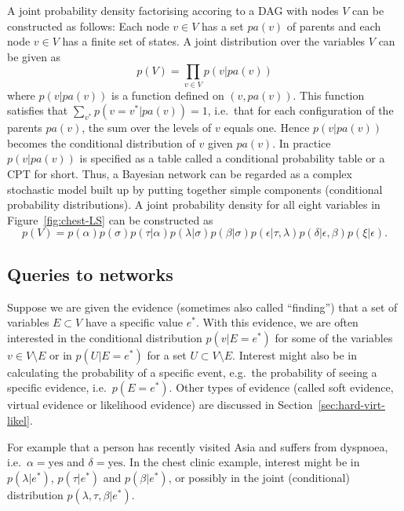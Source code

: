 \documentclass[10pt]{article}\usepackage[]{graphicx}\usepackage[]{xcolor}
\begin{document}
A joint probability density factorising accoring to a DAG with nodes
$V$ can be constructed as follows: Each node $v\in V$ has a set $pa(v)$ of parents and each node
$v\in V$ has a finite set of states. A joint distribution
over the variables $V$ can be given as
\begin{equation}
  \label{eq:dagfact1}
  p(V) = \prod_{v\in V} p(v|pa(v))
\end{equation}
where $p(v|pa(v))$ is a function defined on $(v,pa(v))$. This function
satisfies that $\sum_{v^*} p(v=v^*|pa(v))=1$, i.e.\ that
for each configuration of the parents $pa(v)$, the sum
over the levels of $v$ equals one. Hence $p(v|pa(v))$ becomes the
conditional distribution of $v$ given $pa(v)$.
In practice $p(v|pa(v))$ is specified as a table called a conditional
probability table or a CPT for short.
Thus, a Bayesian network can be regarded as a complex stochastic model built up by
putting together simple components (conditional probability
distributions).
A joint probability density for all eight variables in
Figure~\ref{fig:chest-LS}
can be constructed as 
\begin{equation}
  \label{eq:chestfact1}
  p(V) =
  p(\alpha)p(\sigma)p(\tau|\alpha)p(\lambda|\sigma)p(\beta|\sigma)p(\epsilon|\tau,\lambda)
  p(\delta|\epsilon, \beta)p(\xi|\epsilon).
\end{equation}



\subsection{Queries to networks}
\label{sec:xxx}

Suppose we are given the evidence (sometimes also called ``finding'')
that a set of variables $E\subset V$
have a specific value $e^*$.
With this evidence, we are often interested in the conditional
distribution $p(v|E=e^*)$
for some of the variables $v \in V \setminus E$
or in $p(U|E=e^*)$
for a set $U\subset V \setminus E$. Interest might also be in
calculating the probability of a specific event, e.g.\ the probability
of seeing a specific evidence, i.e.\ $p(E=e^*)$.
Other types of evidence (called soft evidence, virtual evidence or likelihood evidence) are discussed in
Section~\ref{sec:hard-virt-likel}.

For
example that a person has recently visited Asia and suffers from
dyspnoea, i.e.\ $\alpha=\mbox{yes}$ and $\delta=\mbox{yes}$.
In the chest clinic example, interest might be in $p(\lambda|e^*)$, $p(\tau|e^*)$
and  $p(\beta|e^*)$, or possibly in the joint (conditional) distribution
$p(\lambda,\tau,\beta|e^*)$.
\end{document}
